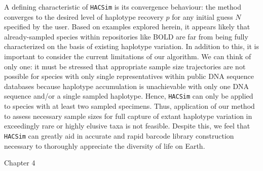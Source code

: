 A defining characteristic of {\tt HACSim} is its convergence behaviour: the method \\ converges to the desired level of haplotype recovery $p$ for any initial guess $N$ specified by the user. Based on examples explored herein, it appears likely that already-sampled species within repositories like BOLD are far from being fully characterized on the basis of existing haplotype variation. In addition to this, it is important to consider the current limitations of our algorithm. We can think of only one: it must be stressed that appropriate sample size trajectories are not possible for species with only single representatives within public DNA sequence databases because haplotype accumulation is unachievable with only one DNA sequence and/or a single sampled haplotype. Hence, {\tt HACSim} can only be applied to species with at least two sampled specimens. Thus, application of our method to assess necessary sample sizes for full capture of extant haplotype variation in exceedingly rare or highly elusive taxa is not feasible. Despite this, we feel that {\tt HACSim} can greatly aid in accurate and rapid barcode library construction necessary to thoroughly appreciate the diversity of life on Earth.























































Chapter 4

